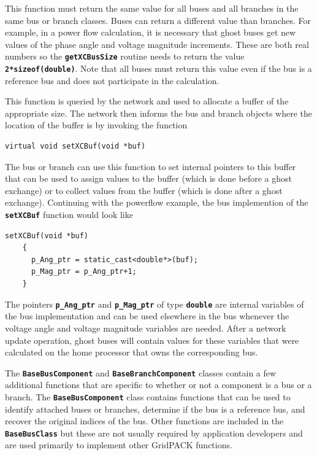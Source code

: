\documentclass[12pt]{report} %
\begin{document}
This function must return the same value for all buses and all branches in the same bus or branch classes. Buses can return a different value than branches. For example, in a power flow calculation, it is necessary that ghost buses get new values of the phase angle and voltage magnitude increments. These are both real numbers so the \texttt{\textbf{getXCBusSize}} routine needs to return the value \texttt{\textbf{2*sizeof(double)}}. Note that all buses must return this value even if the bus is a reference bus and does not participate in the calculation.

This function is queried by the network and used to allocate a buffer of the appropriate size. The network then informs the bus and branch objects where the location of the buffer is by invoking the function

{
\color{red}
\begin{Verbatim}[fontseries=b]
virtual void setXCBuf(void *buf)
\end{Verbatim}
}

The bus or branch can use this function to set internal pointers to this buffer that can be used to assign values to the buffer (which is done before a ghost exchange) or to collect values from the buffer (which is done after a ghost exchange). Continuing with the powerflow example, the bus implemention of the \texttt{\textbf{setXCBuf}} function would look like

{
\color{red}
\begin{Verbatim}[fontseries=b]
    setXCBuf(void *buf)
    {
      p_Ang_ptr = static_cast<double*>(buf);
      p_Mag_ptr = p_Ang_ptr+1;
    }
\end{Verbatim}
}

The pointers \texttt{\textbf{p\_Ang\_ptr}} and \texttt{\textbf{p\_Mag\_ptr}} of type \texttt{\textbf{double}} are internal variables of the bus implementation and can be used elsewhere in the bus whenever the voltage angle and voltage magnitude variables are needed. After a network update operation, ghost buses will contain values for these variables that were calculated on the home processor that owns the corresponding bus.

The \texttt{\textbf{BaseBusComponent}} and \texttt{\textbf{BaseBranchComponent}} classes contain a few additional functions that are specific to whether or not a component is a bus or a branch. The \texttt{\textbf{BaseBusComponent}} class contains functions that can be used to identify attached buses or branches, determine if the bus is a reference bus, and recover the original indices of the bus. Other functions are included in the \texttt{\textbf{BaseBusClass}} but these are not usually required by application developers and are used primarily to implement other GridPACK functions.
\end{document}
